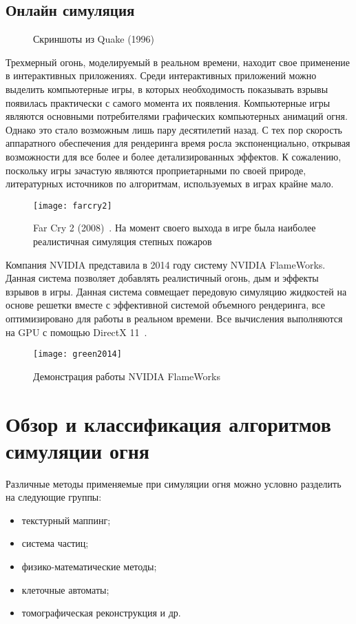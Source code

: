 \subsection{Онлайн симуляция}
\begin{figure}%
    \centering
    \qquad
    \caption{Скриншоты из Quake (1996)~\cite{capstone}}%
    \label{fig:example}%
\end{figure}
Трехмерный огонь, моделируемый в реальном времени, находит свое применение в
интерактивных приложениях. Среди интерактивных приложений можно выделить
компьютерные игры, в которых необходимость показывать взрывы появилась
практически с самого момента их появления. Компьютерные игры являются основными
потребителями графических компьютерных анимаций огня. Однако это стало возможным
лишь пару десятилетий назад. С тех пор скорость аппаратного обеспечения для
рендеринга время росла экспоненциально, открывая возможности для все более и
более детализированных эффектов. К сожалению, поскольку игры зачастую являются
проприетарными по своей природе, литературных источников по алгоритмам,
используемых в играх крайне мало.
\begin{figure}[htb]
	\centering
	\texttt{[image: farcry2]}
	\caption{Far Cry 2 (2008)~\cite{farcry2}. На момент своего выхода в игре
	была наиболее реалистичная симуляция степных пожаров}
\end{figure}
Компания NVIDIA представила в 2014 году систему NVIDIA FlameWorks. Данная
система позволяет добавлять реалистичный огонь, дым и эффекты взрывов в игры.
Данная система совмещает передовую симуляцию жидкостей на основе решетки вместе
с эффективной системой объемного рендеринга, все оптимизировано для работы в
реальном времени. Все вычисления выполняются на GPU с помощью DirectX
11~\cite{Green:2014:NFR:2633956.2658828}.
\begin{figure}[htb]
	\centering
	\texttt{[image: green2014]}
	\caption{Демонстрация работы NVIDIA FlameWorks}
\end{figure}
\section{Обзор и классификация алгоритмов симуляции огня}
Различные методы применяемые при симуляции огня можно условно разделить на
следующие группы:
\begin{itemize}
	\item текстурный маппинг;
	\item система частиц;
	\item физико-математические методы;
	\item клеточные автоматы;
	\item томографическая реконструкция и др.
\end{itemize}

